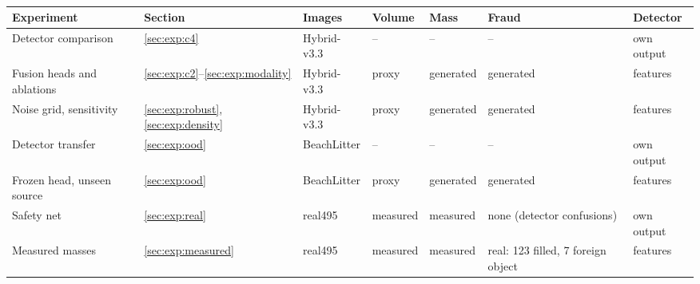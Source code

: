 \begin{table}[tb]
\centering
\caption{}
\label{tab:evidence}
\footnotesize
\setlength{\tabcolsep}{5pt}
\begin{tabular}{@{}lllllll@{}}
\toprule
Experiment & Section & Images & Volume & Mass & Fraud & Detector \\
\midrule
Detector comparison & \ref{sec:exp:c4} & Hybrid-v3.3 & -- & -- & -- & own output \\
Fusion heads and ablations & \ref{sec:exp:c2}--\ref{sec:exp:modality} & Hybrid-v3.3 & proxy & generated & generated & features \\
Noise grid, sensitivity & \ref{sec:exp:robust}, \ref{sec:exp:density} & Hybrid-v3.3 & proxy & generated & generated & features \\
Detector transfer & \ref{sec:exp:ood} & BeachLitter & -- & -- & -- & own output \\
Frozen head, unseen source & \ref{sec:exp:ood} & BeachLitter & proxy & generated & generated & features \\
Safety net & \ref{sec:exp:real} & real495 & measured & measured & none (detector confusions) & own output \\
Measured masses & \ref{sec:exp:measured} & real495 & measured & measured & real: 123 filled, 7 foreign object & features \\
\bottomrule
\end{tabular}
\end{table}

